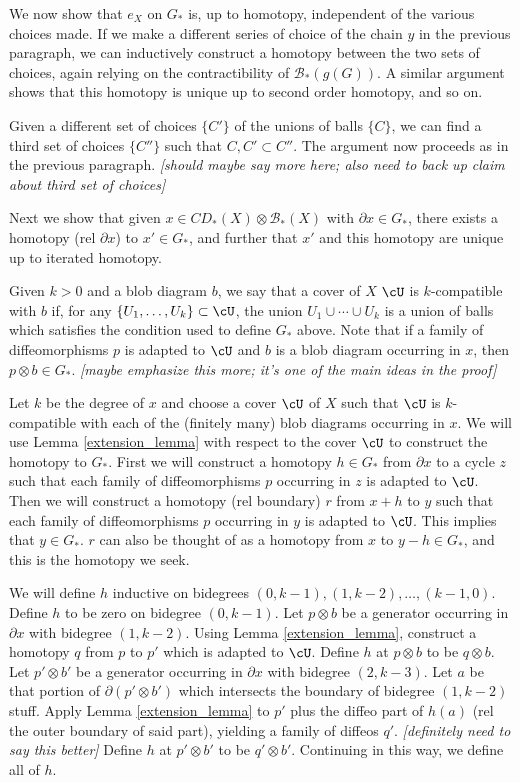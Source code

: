 \documentclass[11pt,leqno]{amsart}
\def\bc{{\mathcal B}}
\def\bd{\partial}
\def\sub{\subset}
\def\nn#1{{{\it \small [#1]}}}
\begin{document}
We now show that $e_X$ on $G_*$ is, up to homotopy, independent of the various choices made.
If we make a different series of choice of the chain $y$ in the previous paragraph, 
we can inductively construct a homotopy between the two sets of choices,
again relying on the contractibility of $\bc_*(g(G))$.
A similar argument shows that this homotopy is unique up to second order homotopy, and so on.

Given a different set of choices $\{C'\}$ of the unions of balls $\{C\}$,
we can find a third set of choices $\{C''\}$ such that $C, C' \sub C''$.
The argument now proceeds as in the previous paragraph.
\nn{should maybe say more here; also need to back up claim about third set of choices}

Next we show that given $x \in CD_*(X) \otimes \bc_*(X)$ with $\bd x \in G_*$, there exists
a homotopy (rel $\bd x$) to $x' \in G_*$, and further that $x'$ and
this homotopy are unique up to iterated homotopy.

Given $k>0$ and a blob diagram $b$, we say that a cover of $X$ $\cU$ is $k$-compatible with
$b$ if, for any $\{U_1, \ldots, U_k\} \sub \cU$, the union 
$U_1\cup\cdots\cup U_k$ is a union of balls which satisfies the condition used to define $G_*$ above.
Note that if a family of diffeomorphisms $p$ is adapted to 
$\cU$ and $b$ is a blob diagram occurring in $x$, then $p\otimes b \in G_*$.
\nn{maybe emphasize this more; it's one of the main ideas in the proof}

Let $k$ be the degree of $x$ and choose a cover $\cU$ of $X$ such that $\cU$ is
$k$-compatible with each of the (finitely many) blob diagrams occurring in $x$.
We will use Lemma \ref{extension_lemma} with respect to the cover $\cU$ to 
construct the homotopy to $G_*$.
First we will construct a homotopy $h \in G_*$ from $\bd x$ to a cycle $z$ such that
each family of diffeomorphisms $p$ occurring in $z$ is adapted to $\cU$.
Then we will construct a homotopy (rel boundary) $r$ from $x + h$ to $y$ such that
each family of diffeomorphisms $p$ occurring in $y$ is adapted to $\cU$.
This implies that $y \in G_*$.
$r$ can also be thought of as a homotopy from $x$ to $y-h \in G_*$, and this is the homotopy we seek.

We will define $h$ inductive on bidegrees $(0, k-1), (1, k-2), \ldots, (k-1, 0)$.
Define $h$ to be zero on bidegree $(0, k-1)$.
Let $p\otimes b$ be a generator occurring in $\bd x$ with bidegree $(1, k-2)$.
Using Lemma \ref{extension_lemma}, construct a homotopy $q$ from $p$ to $p'$ which is adapted to $\cU$.
Define $h$ at $p\otimes b$ to be $q\otimes b$.
Let $p'\otimes b'$ be a generator occurring in $\bd x$ with bidegree $(2, k-3)$.
Let $a$ be that portion of $\bd(p'\otimes b')$ which intersects the boundary of
bidegree $(1, k-2)$ stuff.
Apply Lemma \ref{extension_lemma} to $p'$ plus the diffeo part of $h(a)$
(rel the outer boundary of said part),
yielding a family of diffeos $q'$.
\nn{definitely need to say this better}
Define $h$ at $p'\otimes b'$ to be $q'\otimes b'$.
Continuing in this way, we define all of $h$.
\end{document}

